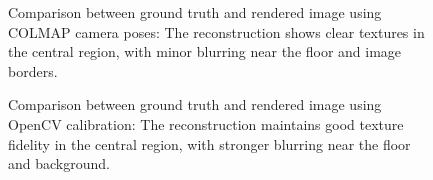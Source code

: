 \begin{figure}[h]
    \centering
    \hfill
    \caption{Comparison between ground truth and rendered image using COLMAP camera poses: The reconstruction shows clear textures in the central region, with minor blurring near the floor and image borders.}
    \label{fig:3dgs_COLMAP}
\end{figure}

\begin{figure}[h]
    \centering
    \hfill
    \caption{Comparison between ground truth and rendered image using OpenCV calibration: The reconstruction maintains good texture fidelity in the central region, with stronger blurring near the floor and background.}
    \label{fig:3dgs_opencv}
\end{figure}

